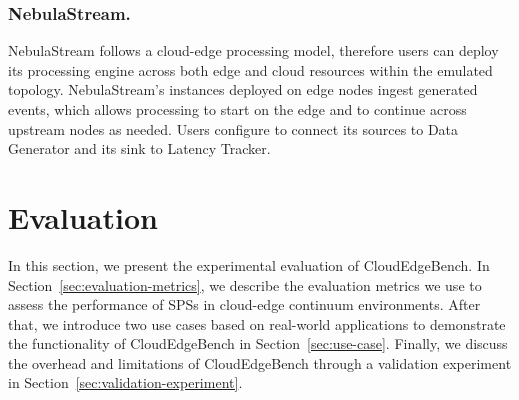\documentclass[runningheads]{llncs}
\begin{document}
\subsubsection{NebulaStream.}
NebulaStream follows a cloud-edge processing model, therefore users can deploy its processing engine across both edge and cloud resources within the emulated topology.
NebulaStream's instances deployed on edge nodes ingest generated events, which allows processing to start on the edge and to continue across upstream nodes as needed.
Users configure to connect its sources to Data Generator and its sink to Latency Tracker.





\section{Evaluation}\label{sec:evaluation}

In this section, we present the experimental evaluation of CloudEdgeBench.
In Section~\ref{sec:evaluation-metrics}, we describe the evaluation metrics we use to assess the performance of SPSs in cloud-edge continuum environments.
After that, we introduce two use cases based on real-world applications to demonstrate the functionality of CloudEdgeBench in Section~\ref{sec:use-case}.
Finally, we discuss the overhead and limitations of CloudEdgeBench through a validation experiment in Section~\ref{sec:validation-experiment}.
\end{document}
